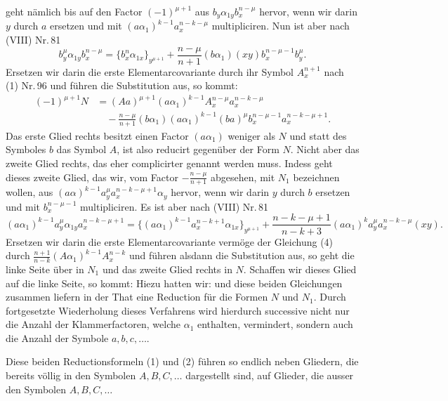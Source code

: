 geht nämlich bis auf den Factor $(-1)^{\mu+1}$ aus $b_y\alpha_{1y}b_x^{n-\mu}$ hervor, wenn wir darin $y$ durch $a$ ersetzen und mit $(a\alpha_1)^{k-1}a_x^{n-k-\mu}$ multipliciren. Nun ist aber nach (VIII) Nr.\,81
\[
b_y^\mu \alpha_{1y} b_x^{n-\mu} = \{b_x^n \alpha_{1x}\}_{y^{\mu+1}} + \frac{n-\mu}{n+1}(b\alpha_1)(xy)b_x^{n-\mu-1}b_y^\mu.
\]
Ersetzen wir darin die erste Elementarcovariante durch ihr Symbol $A_x^{n+1}$ nach (1) Nr.\,96 und führen die Substitution aus, so kommt:
\[
\begin{aligned}
(-1)^{\mu+1} N &= (Aa)^{\mu+1}(a\alpha_1)^{k-1} A_x^{n-\mu} a_x^{n-k-\mu} \\
&\quad - \frac{n-\mu}{n+1}(b\alpha_1)(a\alpha_1)^{k-1}(ba)^\mu b_x^{n-\mu-1} a_x^{n-k-\mu+1}.
\end{aligned}
\]
Das erste Glied rechts besitzt einen Factor $(a\alpha_1)$ weniger als $N$ und statt des Symboles $b$ das Symbol $A$, ist also reducirt gegenüber der Form $N$. Nicht aber das zweite Glied rechts, das eher complicirter genannt werden muss. Indess geht dieses zweite Glied, das wir, vom Factor $-\frac{n-\mu}{n+1}$ abgesehen, mit $N_1$ bezeichnen wollen, aus $(a\alpha)^{k-1} a_y^\mu a_x^{n-k-\mu+1}\alpha_y$ hervor, wenn wir darin $y$ durch $b$ ersetzen und mit $b_x^{n-\mu-1}$ multipliciren. Es ist aber nach (VIII) Nr.\,81
\[
(a\alpha_1)^{k-1} a_y^\mu \alpha_{1y} a_x^{n-k-\mu+1} = \{(a\alpha_1)^{k-1} a_x^{n-k+1} \alpha_{1x}\}_{y^{\mu+1}} + \frac{n-k-\mu+1}{n-k+3}(a\alpha_1)^k a_y^\mu a_x^{n-k-\mu}(xy).
\]
Ersetzen wir darin die erste Elementarcovariante vermöge der Gleichung (4) durch $\frac{n+1}{n-k}(A\alpha_1)^{k-1}A_x^{n-k}$ und führen alsdann die Substitution aus, so geht die linke Seite über in $N_1$ und das zweite Glied rechts in $N$. Schaffen wir dieses Glied auf die linke Seite, so kommt:
Hiezu hatten wir:
und diese beiden Gleichungen zusammen liefern in der That eine Reduction für die Formen $N$ und $N_1$. Durch fortgesetzte Wiederholung dieses Verfahrens wird hierdurch successive nicht nur die Anzahl der Klammerfactoren, welche $\alpha_1$ enthalten, vermindert, sondern auch die Anzahl der Symbole $a, b, c,\ldots$.

Diese beiden Reductionsformeln (1) und (2) führen so endlich neben Gliedern, die bereits völlig in den Symbolen $A, B, C,\ldots$ dargestellt sind, auf Glieder, die ausser den Symbolen $A, B, C,\ldots$


